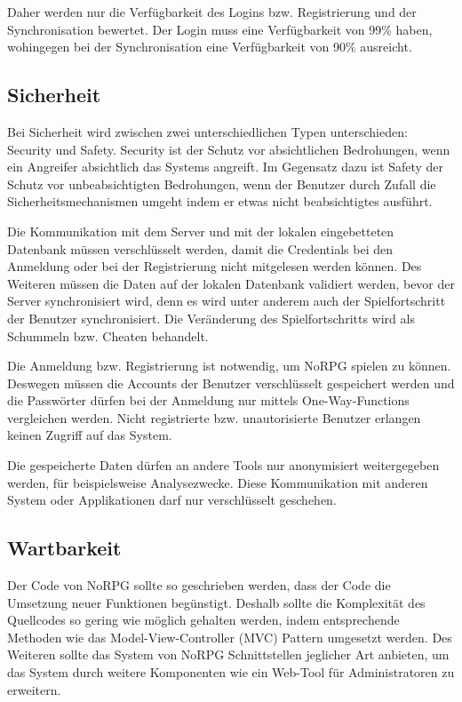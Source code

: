 		Daher werden nur die Verfügbarkeit des Logins bzw. Registrierung und der Synchronisation bewertet. Der Login muss eine Verfügbarkeit von 99\% haben, wohingegen bei der Synchronisation eine Verfügbarkeit von 90\% ausreicht.
		
	\subsection{Sicherheit}
		Bei Sicherheit wird zwischen zwei unterschiedlichen Typen unterschieden: Security und Safety. Security ist der Schutz vor absichtlichen Bedrohungen, wenn ein Angreifer absichtlich das Systems angreift. Im Gegensatz dazu ist Safety der Schutz vor unbeabsichtigten Bedrohungen, wenn der Benutzer durch Zufall die Sicherheitsmechanismen umgeht indem er etwas nicht beabsichtigtes ausführt.
		
		Die Kommunikation mit dem Server und mit der lokalen eingebetteten Datenbank müssen verschlüsselt werden, damit die Credentials bei den Anmeldung oder bei der Registrierung nicht mitgelesen werden können. Des Weiteren müssen die Daten auf der lokalen Datenbank validiert werden, bevor der Server synchronisiert wird, denn es wird unter anderem auch der Spielfortschritt der Benutzer synchronisiert. Die Veränderung des Spielfortschritts wird als Schummeln bzw. Cheaten behandelt.
		
		Die Anmeldung bzw. Registrierung ist notwendig, um NoRPG spielen zu können. Deswegen müssen die Accounts der Benutzer verschlüsselt gespeichert werden und die Passwörter dürfen bei der Anmeldung nur mittels One-Way-Functions vergleichen werden. Nicht registrierte bzw. unautorisierte Benutzer erlangen keinen Zugriff auf das System.
		
		Die gespeicherte Daten dürfen an andere Tools nur anonymisiert weitergegeben werden, für beispielsweise Analysezwecke. Diese Kommunikation mit anderen System oder Applikationen darf nur verschlüsselt geschehen.
		
	\subsection{Wartbarkeit}
		Der Code von NoRPG sollte so geschrieben werden, dass der Code die Umsetzung neuer Funktionen begünstigt. Deshalb sollte die Komplexität des Quellcodes so gering wie möglich gehalten werden, indem entsprechende Methoden wie das Model-View-Controller (MVC) Pattern umgesetzt werden. Des Weiteren sollte das System von NoRPG Schnittstellen jeglicher Art anbieten, um das System durch weitere Komponenten wie ein Web-Tool für Administratoren zu erweitern.
		
